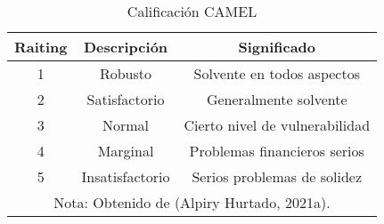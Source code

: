 \begin{table}[h!]

\centering
\caption{Calificación CAMEL}
\label{tab:calificacion-camel-marco-teorico}

\begin{tabular}{|c|c|c|}
\hline
\textbf{Raiting} & \textbf{Descripción} & \textbf{Significado}            \\ \hline
1                & Robusto              & Solvente en todos aspectos      \\ \hline
2                & Satisfactorio        & Generalmente solvente           \\ \hline
3                & Normal               & Cierto nivel de vulnerabilidad  \\ \hline
4                & Marginal             & Problemas financieros serios    \\ \hline
5                & Insatisfactorio      & Serios problemas de solidez \\ \hline

\multicolumn{3}{c}{\footnotesize Nota: Obtenido de (Alpiry Hurtado, 2021a).}

\end{tabular}

 
\end{table}


